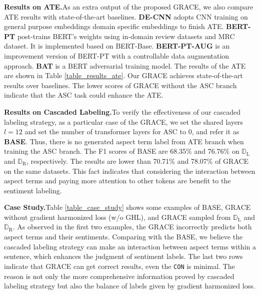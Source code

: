 \documentclass[11pt,a4paper]{article}
\begin{document}
\vspace{+1mm}
\noindent
\textbf{Results on ATE.}\quad As an extra output of the proposed GRACE, we also compare ATE results with state-of-the-art baselines. \textbf{DE-CNN} \cite{Xu2018} adopts CNN training on general purpose embeddings  domain specific embeddings to finish ATE. \textbf{BERT-PT} \cite{Xu2019} post-trains BERT’s weights using in-domain review datasets and MRC dataset. It is implemented based on BERT-Base. \textbf{BERT-PT-AUG} \cite{Li2020} is an improvement version of BERT-PT with a controllable data augmentation approach. \textbf{BAT} \cite{Karimi2020} is a BERT adversarial training model. The results of the ATE are shown in Table \ref{table_results_ate}. Our GRACE achieves state-of-the-art results over baselines. The lower scores of GRACE without the ASC branch indicate that the ASC task could enhance the ATE.

\vspace{+1mm}
\noindent
\textbf{Results on Cascaded Labeling.}\quad To verify the effectiveness of our cascaded labeling strategy, as a particular case of the GRACE, we set the shared layers $l=12$ and set the number of transformer layers for ASC to 0, and refer it as \textbf{BASE}. Thus, there is no generated aspect term label from ATE branch when training the ASC branch. The F1 scores of BASE are 68.35\% and 76.76\% on $\mathbb{D}_\text{L}$ and $\mathbb{D}_\text{R}$, respectively. The results are lower than 70.71\% and 78.07\% of GRACE on the same datasets. This fact indicates that considering the interaction between aspect terms and paying more attention to other tokens are benefit to the sentiment labeling.

\vspace{+1mm}
\noindent
\textbf{Case Study.}\quad Table \ref{table_case_study} shows some examples of BASE, GRACE without gradient harmonized loss (w/o GHL), and GRACE sampled from $\mathbb{D}_\text{L}$ and $\mathbb{D}_\text{R}$. As observed in the first two examples, the GRACE  incorrectly predicts both aspect terms and their sentiments. Comparing with the BASE, we believe the cascaded labeling strategy can make an interaction between aspect terms within a sentence, which enhances the judgment of sentiment labels. The last two rows indicate that GRACE can get correct results, even the \texttt{CON} is minimal. The reason is not only the more comprehensive information proved by cascaded labeling strategy but also the balance of labels given by gradient harmonized loss.
\end{document}
